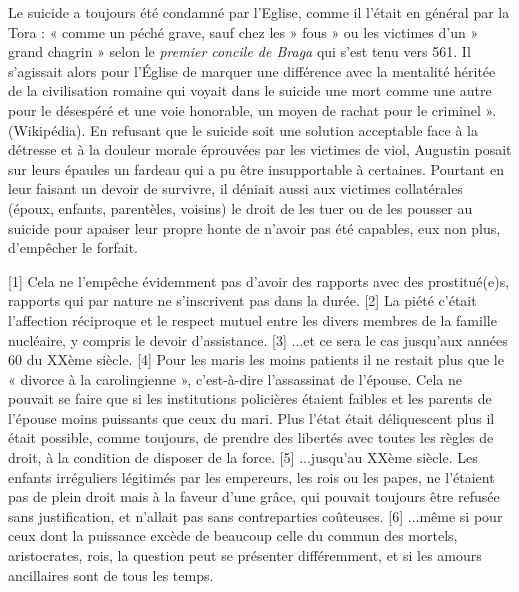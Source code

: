 Le suicide a toujours été condamné par l'Eglise, comme il l'était en général par la Tora : « comme un péché grave, sauf chez les » fous » ou les victimes d'un » grand chagrin » selon le \emph{premier concile de Braga} qui s'est tenu vers 561. Il s'agissait alors pour l'Église de marquer une différence avec la mentalité héritée de la civilisation romaine qui voyait dans le suicide une mort comme une autre pour le désespéré et une voie honorable, un moyen de rachat pour le criminel ». (Wikipédia). 
 En refusant que le suicide soit une solution acceptable face à la détresse et à la douleur morale éprouvées par les victimes de viol, Augustin posait sur leurs épaules un fardeau qui a pu être insupportable à certaines. Pourtant en leur faisant un devoir de survivre, il déniait aussi aux victimes collatérales (époux, enfants, parentèles, voisins) le droit de les tuer ou de les pousser au suicide pour apaiser leur propre honte de n'avoir pas été capables, eux non plus, d'empêcher le forfait.
 
[1] Cela ne l'empêche évidemment pas d'avoir des rapports avec des prostitué(e)s, rapports qui par nature ne s'inscrivent pas dans la durée.
[2] La piété c'était l'affection réciproque et le respect mutuel entre les divers membres de la famille nucléaire, y compris le devoir d'assistance.
[3] ...et ce sera le cas jusqu'aux années 60 du XXème siècle.
[4] Pour les maris les moins patients il ne restait plus que le « divorce à la carolingienne », c'est-à-dire l'assassinat de l'épouse. Cela ne pouvait se faire que si les institutions policières étaient faibles et les parents de l'épouse moins puissants que ceux du mari. Plus l'état était déliquescent plus il était possible, comme toujours, de prendre des libertés avec toutes les règles de droit, à la condition de disposer de la force.
[5] ...jusqu'au XXème siècle. Les enfants irréguliers légitimés par les empereurs, les rois ou les papes, ne l'étaient pas de plein droit mais à la faveur d'une grâce, qui pouvait toujours être refusée sans justification, et n'allait pas sans contreparties coûteuses.
[6] ...même si pour ceux dont la puissance excède de beaucoup celle du commun des mortels, aristocrates, rois, la question peut se présenter différemment, et si les amours ancillaires sont de tous les temps.